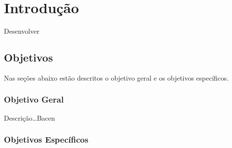 \documentclass[
	12pt,				%
	oneside,			%
	a4paper,			%
	chapter=TITLE,		%
	section=TITLE,		%
	english,			%
	brazil				%
	]{abntex2}
\begin{document}
{%
	\hypersetup{hidelinks}
	\listoffigures*
	\cleardoublepage
	
	\listofquadros*
	\cleardoublepage
	
	\listoftables*
	\cleardoublepage
	
	\imprimirlistadesiglas
	
	\imprimirlistadesimbolos
	
	\tableofcontents*
	\cleardoublepage
	
}%


\textual

\hypertarget{intro}{%
\chapter{Introdução}\label{intro}}

Desenvolver

\hypertarget{objetivos}{%
\section{Objetivos}\label{objetivos}}

Nas seções abaixo estão descritos o objetivo geral e os objetivos
específicos.

\hypertarget{objetivo-geral}{%
\subsection{Objetivo Geral}\label{objetivo-geral}}

Descrição\ldots{}\gls{Bacen}

\hypertarget{objetivos-especuxedficos}{%
\subsection{Objetivos Específicos}\label{objetivos-especuxedficos}}
\end{document}
